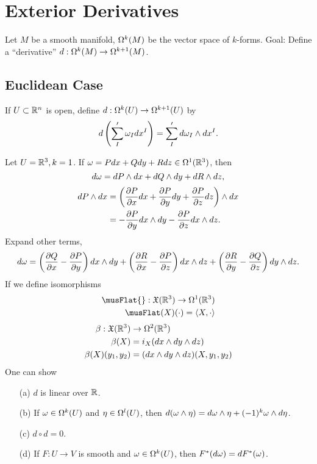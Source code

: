 \section{Exterior Derivatives}
Let $M$ be a smooth manifold, $\Omega^k(M)$ be the vector space of $k$-forms.
Goal: Define a ``derivative'' $d:\Omega^k(M) \to \Omega^{k+1}(M)$. 
\subsection{Euclidean Case}
If $U \subset \mathbb{R}^n$ is open, define $d:\Omega^k(U) \to \Omega^{k+1}(U)$ by 
$$d\left(\sum_I' \omega_I dx^I\right) = \sum_{I}'d\omega_I \wedge dx^I. $$
\begin{example}
    Let $U = \mathbb{R}^3, k=1$. If $\omega = Pdx + Qdy + Rdz \in \Omega^1(\mathbb{R}^3)$, then 
    $$d\omega = dP \wedge dx + dQ \wedge dy + dR \wedge dz,$$
    \begin{align*}
    dP \wedge dx &= \left(\pdv{P}{x}dx + \pdv{P}{y}dy + \pdv{P}{z}dz
    \right) \wedge dx \\
    &= -\pdv{P}{y}dx \wedge dy - \pdv{P}{z}dx \wedge dz.
    \end{align*}
    Expand other terms,
    $$d\omega = \left(\pdv{Q}{x}-\pdv{P}{y}\right)dx \wedge dy
    + \left(\pdv{R}{x}-\pdv{P}{z}\right)dx \wedge dz
    + \left(\pdv{R}{y}-\pdv{Q}{z}\right)dy \wedge dz. $$
    If we define isomorphisms 
    \begin{align*}
        \musFlat{}:\frak{X}(\R^3) \to \Omg^1(\R^3) \\
        \musFlat(X)(\cdot) = \net{X, \cdot}
    \end{align*}
    \begin{align*}
    \beta:\frak{X}(\mathbb{R}^3) &\to \Omega^2(\mathbb{R}^3)  \\
    \beta(X) &= i_X(dx \wedge dy \wedge dz) \\
    \beta(X)(y_1,y_2) &= (dx \wedge dy \wedge dz)(X,y_1,y_2)
    \end{align*}
    One can show 
    \begin{center}
    \end{center}
    
\end{example}
\begin{proposition}\label{14.23}
    \begin{enumerate}
    \item[(a)] $d$ is linear over $\mathbb{R}$.
    \item[(b)] If $\omega \in \Omega^k(U)$ and $\eta \in \Omega^l(U)$, then $d(\omega \wedge \eta) = d\omega \wedge \eta + (-1)^k\omega \wedge d\eta$.
    \item[(c)] $d \circ d = 0$.
    \item[(d)] If $F:U \to V$ is smooth and $\omega \in \Omega^k(U)$, then $F^*(d\omega) = dF^*(\omega)$. 
    \end{enumerate}
\end{proposition}
